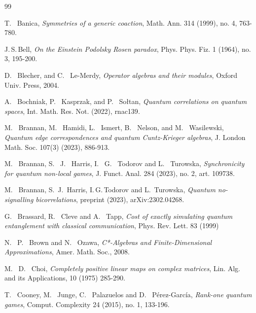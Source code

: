 \documentclass[11pt]{amsart}
\begin{document}
\begin{thebibliography}{99}


{\sc T. \, Banica},
{\it Symmetries of a generic coaction},
{\rm Math. Ann. 314 (1999), no. 4, 763-780}.

{\sc J.\,S.\,Bell}, 
{\it  On the Einstein Podolsky Rosen paradox}, 
{\rm Phys. Phys. Fiz. 1 (1964), no. 3, 195-200}.

{\sc D. \, Blecher, and C. \, Le-Merdy},
{\it Operator algebras and their modules},
{\rm Oxford Univ. Press, 2004}.

{\sc A. \, Bochniak, P. \, Kasprzak, and P. \, Sołtan},
{\it Quantum correlations on quantum spaces},
{\rm Int. Math. Res. Not. (2022), rnac139}.

{\sc M. \, Brannan, M. \, Hamidi, L. \, Ismert, B. \, Nelson, and M. \, Wasilewski},
{\it Quantum edge correspondences and quantum Cuntz-Krieger algebras},
{\rm J. London Math. Soc. 107(3) (2023), 886-913}.

{\sc M. \, Brannan, S. \, J. \, Harris, I. \, G. \, Todorov and L. \, Turowska},
{\it Synchronicity for quantum non-local games},
{\rm J. Funct. Anal. 284 (2023), no. 2, art. 109738}.

{\sc M. \, Brannan, S.\, J.\, Harris, I.\,G.\,Todorov and L.\, Turowska},
{\it Quantum no-signalling bicorrelations},
{\rm preprint (2023), arXiv:2302.04268.}

{\sc G. \, Brassard, R. \, Cleve and A. \, Tapp},
{\it Cost of exactly simulating quantum entanglement with classical communication},
{\rm Phys. Rev. Lett. 83 (1999)}

{\sc N. \, P. \, Brown and N. \, Ozawa},
{\it C*-Algebras and Finite-Dimensional Approximations},
{\rm Amer. Math. Soc., 2008}.

{\sc M. \, D. \, Choi},
{\it Completely positive linear maps on complex matrices},
{\rm Lin. Alg. and its Applications, 10 (1975) 285-290}.

{\sc T. \, Cooney, M. \, Junge, C. \, Palazuelos and D. \, Pérez-García},
{\it Rank-one quantum games},
{\rm Comput. Complexity 24 (2015), no. 1, 133-196}.


\end{thebibliography}
\end{document}
